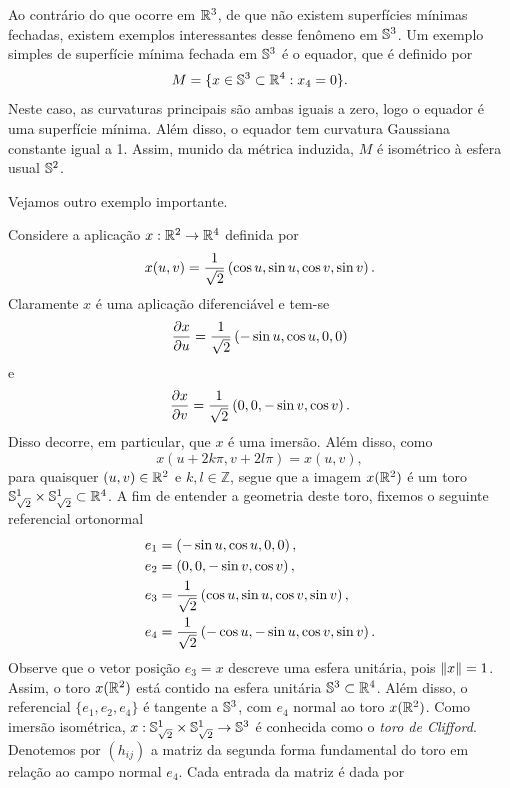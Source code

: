Ao contrário do que ocorre em $\mathbb{R}^3$, de que não existem superfícies mínimas fechadas, existem exemplos interessantes desse fenômeno em $\mathbb{S}^3$. Um exemplo simples de superfície mínima fechada em $\mathbb{S}^3$ é o equador, que é definido por
\[ M = \{ x \in \mathbb{S}^3 \subset \mathbb{R}^4: x_4=0 \}. \]
Neste caso, as curvaturas principais são ambas iguais a zero, logo o equador é uma superfície mínima. Além disso, o equador tem curvatura Gaussiana constante igual a 1. Assim, munido da métrica induzida, $M$ é isométrico à esfera usual $\mathbb{S}^2$.

Vejamos outro exemplo importante.

\begin{exemplo}
	Considere a aplicação $x: \mathbb{R}^2 \rightarrow \mathbb{R}^4$ definida por
	\begin{equation}\label{def:toro-de-clifford}
		x(u,v) = \frac{1}{\sqrt{2}} \left( \cos u, \sin u, \cos v, \sin v \right).
	\end{equation}
	Claramente $x$ é uma aplicação diferenciável e tem-se
	\[ \frac{\partial x}{\partial u} = \frac{1}{\sqrt{2}} \left( -\sin u, \cos u, 0, 0 \right) \]
	e
	\[ \frac{\partial x}{\partial v} = \frac{1}{\sqrt{2}} \left( 0,0, -\sin v, \cos v \right). \]
	Disso decorre, em particular, que $x$ é uma imersão. Além disso, como 
	\[x(u + 2k \pi, v + 2l \pi) = x(u,v), \] 
	para quaisquer $(u,v) \in \mathbb{R}^2$ e $k,l \in \mathbb{Z}$, segue que a imagem $x(\mathbb{R}^2)$ é um toro $\mathbb{S}_{\sqrt{2}}^1 \times \mathbb{S}_{\sqrt{2}}^1 \subset \mathbb{R}^4$. A fim de entender a geometria deste toro, fixemos o seguinte referencial ortonormal
	\begin{align*}
		e_1 &= \left( -\sin u, \cos u, 0, 0 \right),\\
		e_2 &= \left( 0, 0, -\sin v, \cos v \right),\\
		e_3 &= \frac{1}{\sqrt{2}} \left( \cos u, \sin u, \cos v, \sin v \right),\\
		e_4 &= \frac{1}{\sqrt{2}} \left( -\cos u, -\sin u, \cos v, \sin v \right).
	\end{align*}
	Observe que o vetor posição $e_3 = x$ descreve uma esfera unitária, pois $\left\| x \right\| = 1$. Assim, o toro $x(\mathbb{R}^2)$ está contido na esfera unitária $\mathbb{S}^3 \subset \mathbb{R}^4$. Além disso, o referencial $\{e_1,e_2,e_4\}$ é tangente a $\mathbb{S}^3$, com
	$e_4$ normal ao toro $x(\mathbb{R}^2)$. Como imersão isométrica, $x: \mathbb{S}_{\sqrt{2}}^1 \times \mathbb{S}_{\sqrt{2}}^1 \rightarrow \mathbb{S}^3$ é conhecida como o \emph{toro de Clifford}. Denotemos por $(h_{ij})$ a matriz da segunda forma fundamental do toro em relação ao campo normal $e_4$. Cada entrada da matriz é dada por

\end{exemplo}

